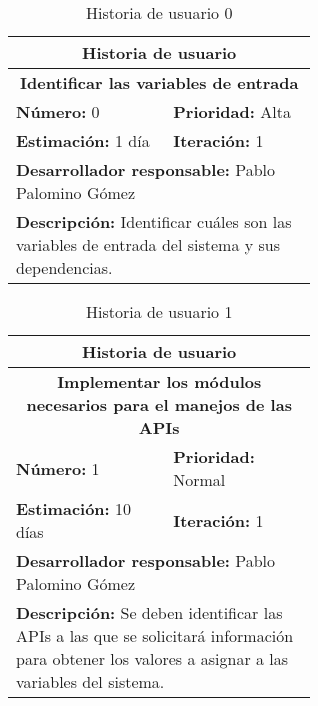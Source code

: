 \begin{table}[H]
        \centering
        \begin{tabular}{|p{0.3\linewidth}|p{0.3\linewidth}|}
          \hline
          \multicolumn{2}{|c|}{Historia de usuario}\\ \hline
          \multicolumn{2}{|c|}{\textbf{Identificar las variables de entrada}}\\ \hline
          \textbf{Número:} 0 & \textbf{Prioridad:} Alta\\ \hline
          \textbf{Estimación:} 1 día & \textbf{Iteración:} 1\\ \hline
          \multicolumn{2}{|l|}{\textbf{Desarrollador responsable:} Pablo Palomino Gómez}\\ \hline
          \multicolumn{2}{|p{0.6\linewidth}|}{\textbf{Descripción:} Identificar cuáles son las variables de entrada del sistema y sus dependencias.}\\ \hline
        \end{tabular}
        \caption{Historia de usuario 0}
        \label{tab:hist0}
\end{table}
\begin{table}[H]
        \centering
        \begin{tabular}{|p{0.3\linewidth}|p{0.3\linewidth}|}
          \hline
          \multicolumn{2}{|c|}{Historia de usuario}\\ \hline
          \multicolumn{2}{|c|}{\textbf{Implementar los módulos necesarios para el manejos de las APIs}}\\ \hline
          \textbf{Número:} 1 & \textbf{Prioridad:} Normal\\ \hline
          \textbf{Estimación:} 10 días & \textbf{Iteración:} 1\\ \hline
          \multicolumn{2}{|l|}{\textbf{Desarrollador responsable:} Pablo Palomino Gómez}\\ \hline
          \multicolumn{2}{|p{0.8\linewidth}|}{\textbf{Descripción:} Se deben identificar las APIs a las que se solicitará información para obtener los valores a asignar a las variables del sistema.}\\ \hline
        \end{tabular}
        \caption{Historia de usuario 1}
        \label{tab:hist1}
\end{table}
